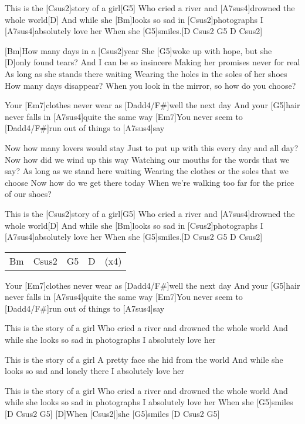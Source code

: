 

\begin{guitar}
	This is the [Csus2]story of a girl[G5]{}
	Who cried a river and [A7sus4]drowned the whole world[D]{}
	And while she [Bm]looks so sad in [Csus2]photographs
	I [A7sus4]absolutely love her
	When she [G5]smiles.[D Csus2 G5 D Csus2]{}
	
	[Bm]How many days in a [Csus2]year
	She [G5]woke up with hope, but she [D]only found tears?
	And I can be so insincere
	Making her promises never for real
	As long as she stands there waiting
	Wearing the holes in the soles of her shoes
	How many days disappear?
	When you look in the mirror, so how do you choose?
	
	Your [Em7]clothes never wear as [Dadd4/F#]well the next day
	And your [G5]hair never falls in [A7sus4]quite the same way
	[Em7]You never seem to [Dadd4/F#]run out of things to [A7sus4]say
	
	 
	
	Now how many lovers would stay
	Just to put up with this every day and all day?
	Now how did we wind up this way
	Watching our mouths for the words that we say?
	As long as we stand here waiting
	Wearing the clothes or the soles that we choose
	Now how do we get there today
	When we're walking too far for the price of our shoes?
	
	 
	\pagebreak
	This is the [Csus2]story of a girl[G5]{}
	Who cried a river and [A7sus4]drowned the whole world[D]{}
	And while she [Bm]looks so sad in [Csus2]photographs
	I [A7sus4]absolutely love her
	When she [G5]smiles.[D Csus2 G5 D Csus2]{}
	
	{\footnotesize\begin{tabular}{|l|l|l|l|l}
			Bm & Csus2 & G5 & D & (x4)
	\end{tabular}}
	
	Your [Em7]clothes never wear as [Dadd4/F#]well the next day
	And your [G5]hair never falls in [A7sus4]quite the same way
	[Em7]You never seem to [Dadd4/F#]run out of things to [A7sus4]say
	
	This is the story of a girl
	Who cried a river and drowned the whole world
	And while she looks so sad in photographs
	I absolutely love her
		
	This is the story of a girl
	A pretty face she hid from the world
	And while she looks so sad and lonely there
	I absolutely love her
	
	This is the story of a girl
	Who cried a river and drowned the whole world
	And while she looks so sad in photographs
	I absolutely love her
	When she [G5]smiles [D Csus2 G5]{}
	[D]When [Csus2|]{she} [G5]smiles [D Csus2 G5]{}
\end{guitar}